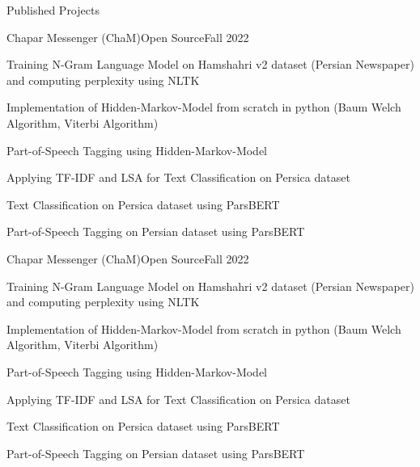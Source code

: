 \documentclass[]{main}
\begin{document}
\begin{section}{Published Projects}
 \begin{subsection}{Chapar Messenger (ChaM)}{Open Source}{Fall 2022}{}
     \item Training N-Gram Language Model on Hamshahri v2 dataset (Persian Newspaper) and computing perplexity using NLTK \;\href{https://github.com/ckoliber/nlpexercises/blob/main/src/exercise1.ipynb}{\faExternalLink*}
     \item Implementation of Hidden-Markov-Model from scratch in python (Baum Welch Algorithm, Viterbi Algorithm) \;\href{https://github.com/ckoliber/nlpexercises/blob/main/src/hmm/hmm.py}{\faExternalLink*}
     \item Part-of-Speech Tagging using Hidden-Markov-Model \;\href{https://github.com/ckoliber/nlpexercises/blob/main/src/exercise3.ipynb}{\faExternalLink*}
     \item Applying TF-IDF and LSA for Text Classification on Persica dataset \;\href{https://github.com/ckoliber/nlpexercises/blob/main/src/exercise4.ipynb}{\faExternalLink*}
     \item Text Classification on Persica dataset using ParsBERT \;\href{https://github.com/ckoliber/nlpexercises/blob/main/src/exercise5.ipynb}{\faExternalLink*}
     \item Part-of-Speech Tagging on Persian dataset using ParsBERT \;\href{https://github.com/ckoliber/nlpexercises/blob/main/src/exercise6.ipynb}{\faExternalLink*}
 \end{subsection}

 \begin{subsection}{Chapar Messenger (ChaM)}{Open Source}{Fall 2022}{}
     \item Training N-Gram Language Model on Hamshahri v2 dataset (Persian Newspaper) and computing perplexity using NLTK \;\href{https://github.com/ckoliber/nlpexercises/blob/main/src/exercise1.ipynb}{\faExternalLink*}
     \item Implementation of Hidden-Markov-Model from scratch in python (Baum Welch Algorithm, Viterbi Algorithm) \;\href{https://github.com/ckoliber/nlpexercises/blob/main/src/hmm/hmm.py}{\faExternalLink*}
     \item Part-of-Speech Tagging using Hidden-Markov-Model \;\href{https://github.com/ckoliber/nlpexercises/blob/main/src/exercise3.ipynb}{\faExternalLink*}
     \item Applying TF-IDF and LSA for Text Classification on Persica dataset \;\href{https://github.com/ckoliber/nlpexercises/blob/main/src/exercise4.ipynb}{\faExternalLink*}
     \item Text Classification on Persica dataset using ParsBERT \;\href{https://github.com/ckoliber/nlpexercises/blob/main/src/exercise5.ipynb}{\faExternalLink*}
     \item Part-of-Speech Tagging on Persian dataset using ParsBERT \;\href{https://github.com/ckoliber/nlpexercises/blob/main/src/exercise6.ipynb}{\faExternalLink*}
 \end{subsection}


\end{section}
\end{document}
